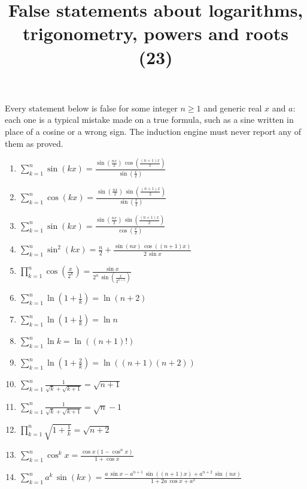 \documentclass[11pt,a4paper]{article}
\title{False statements about logarithms, trigonometry, powers and roots (23)}
\author{}
\date{}
\begin{document}
\maketitle
Every statement below is false for some integer $n\ge1$ and generic real $x$ and $a$: each one is a typical mistake made on a true formula, such as a sine written in place of a cosine or a wrong sign. The induction engine must never report any of them as proved.

\begin{enumerate}
\item $\displaystyle \sum_{k=1}^{n} \sin\left(k x\right) = \frac{\sin\left(\frac{n x}{2}\right)\,\cos\left(\frac{\left(n + 1\right)x}{2}\right)}{\sin\left(\frac{x}{2}\right)}$
\item $\displaystyle \sum_{k=1}^{n} \cos\left(k x\right) = \frac{\sin\left(\frac{n x}{2}\right)\,\sin\left(\frac{\left(n + 1\right)x}{2}\right)}{\sin\left(\frac{x}{2}\right)}$
\item $\displaystyle \sum_{k=1}^{n} \sin\left(k x\right) = \frac{\sin\left(\frac{n x}{2}\right)\,\sin\left(\frac{\left(n + 1\right)x}{2}\right)}{\cos\left(\frac{x}{2}\right)}$
\item $\displaystyle \sum_{k=1}^{n} \sin^{2}\left(k x\right) = \frac{n}{2} + \frac{\sin\left(n x\right)\,\cos\left(\left(n + 1\right)x\right)}{2\,\sin x}$
\item $\displaystyle \prod_{k=1}^{n} \cos\left(\frac{x}{2^{k}}\right) = \frac{\sin x}{2^{n}\,\sin\left(\frac{x}{2^{n + 1}}\right)}$
\item $\displaystyle \sum_{k=1}^{n} \ln\left(1 + \frac{1}{k}\right) = \ln\left(n + 2\right)$
\item $\displaystyle \sum_{k=1}^{n} \ln\left(1 + \frac{1}{k}\right) = \ln n$
\item $\displaystyle \sum_{k=1}^{n} \ln k = \ln\left(\left(n + 1\right)!\right)$
\item $\displaystyle \sum_{k=1}^{n} \ln\left(1 + \frac{2}{k}\right) = \ln\left(\left(n + 1\right)\left(n + 2\right)\right)$
\item $\displaystyle \sum_{k=1}^{n} \frac{1}{\sqrt{k} + \sqrt{k + 1}} = \sqrt{n + 1}$
\item $\displaystyle \sum_{k=1}^{n} \frac{1}{\sqrt{k} + \sqrt{k + 1}} = \sqrt{n} - 1$
\item $\displaystyle \prod_{k=1}^{n} \sqrt{1 + \frac{1}{k}} = \sqrt{n + 2}$
\item $\displaystyle \sum_{k=1}^{n} \cos^{k} x = \frac{\cos x\left(1 - \cos^{n} x\right)}{1 + \cos x}$
\item $\displaystyle \sum_{k=1}^{n} a^{k}\,\sin\left(k x\right) = \frac{a\,\sin x - a^{n + 1}\,\sin\left(\left(n + 1\right)x\right) + a^{n + 2}\,\sin\left(n x\right)}{1 + 2a\,\cos x + a^{2}}$

\end{enumerate}
\end{document}
